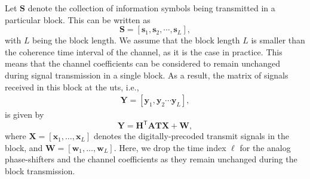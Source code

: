 \documentclass[12pt,draftclsnofoot,onecolumn,journal]{IEEEtran}
\newcommand{\dbc}[1]{ \left[ #1 \right] }
\newcommand{\trp}{\mathsf{T}}
\begin{document}
Let $\mathbf S$ denote the collection of information symbols being transmitted in a particular block. This can be written as 
\begin{equation}
	\mathbf S=\left[ \mathbf s_1, \mathbf s_2, \cdots,  \mathbf s_L\right] ,
\end{equation}
with $L$ being the block length. %
We assume that the block length $L$ is smaller than the coherence time interval of the channel, as it is the case in practice. This means that the channel coefficients can be considered to remain unchanged during signal transmission in a single block. As a result, the matrix of signals received in this block at the \acp{ut}, i.e., 
\begin{align}
	\mathbf Y=\left[ \mathbf y_1, \mathbf y_2 \cdots  \mathbf y_L\right],
\end{align}
is given by
 \begin{equation}
	\mathbf Y=\mathbf{H}^\trp \mathbf{A} \mathbf{T} \mathbf{X}+\mathbf{W}, 
\end{equation}
where $\mathbf{X}=\dbc{\mathbf x_1,  \dots, \mathbf x_L }$ denotes the digitally-precoded transmit signals in the block, and $\mathbf{W}=\dbc{\mathbf w_1,  \dots, \mathbf w_L }$. Here, we drop the time index $\ell$ for the analog phase-shifters and the channel coefficients as they remain unchanged during the block transmission.
\end{document}
